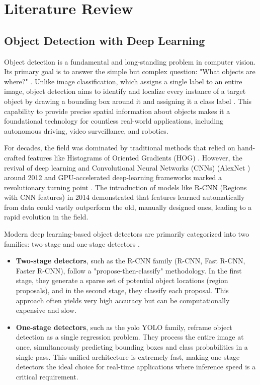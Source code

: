 \chapter{Literature Review}
\label{chap:lit_review}

\section{Object Detection with Deep Learning}
\label{sec:lit_object_detection}

Object detection is a fundamental and long-standing problem in computer vision. Its primary goal is to answer the simple but complex question: "What objects are where?" \cite{zou2023object}. Unlike image classification, which assigns a single label to an entire image, object detection aims to identify and localize every instance of a target object by drawing a bounding box around it and assigning it a class label \cite{wu2019recent}. This capability to provide precise spatial information about objects makes it a foundational technology for countless real-world applications, including autonomous driving, video surveillance, and robotics.

For decades, the field was dominated by traditional methods that relied on hand-crafted features like Histograms of Oriented Gradients (HOG) \cite{dalal2005histograms}. However, the revival of deep learning and Convolutional Neural Networks (CNNs) (AlexNet \cite{krizhevsky2012imagenet}) around 2012 and GPU-accelerated deep-learning frameworks marked a revolutionary turning point \cite{zou2023object}. The introduction of models like R-CNN (Regions with CNN features) \cite{girshick2014rich} in 2014 demonstrated that features learned automatically from data could vastly outperform the old, manually designed ones, leading to a rapid evolution in the field.

Modern deep learning-based object detectors are primarily categorized into two families: two-stage and one-stage detectors \cite{wu2019recent}.
\begin{itemize}
    \item \textbf{Two-stage detectors}, such as the R-CNN family (R-CNN, Fast R-CNN, Faster R-CNN), follow a "propose-then-classify" methodology. In the first stage, they generate a sparse set of potential object locations (region proposals), and in the second stage, they classify each proposal. This approach often yields very high accuracy but can be computationally expensive and slow.
    \item \textbf{One-stage detectors}, such as the \gls{yolo} YOLO  \cite{redmon2016you} family, reframe object detection as a single regression problem. They process the entire image at once, simultaneously predicting bounding boxes and class probabilities in a single pass. This unified architecture is extremely fast, making one-stage detectors the ideal choice for real-time applications where inference speed is a critical requirement.
\end{itemize}

